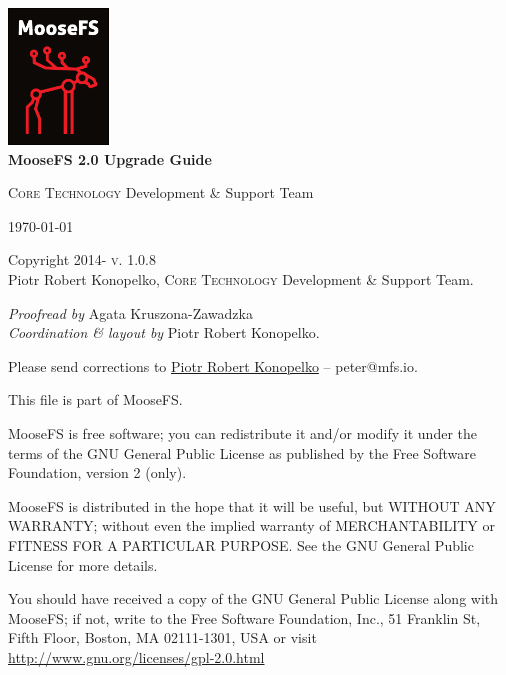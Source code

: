 \documentclass[a4paper,11pt,english]{report}
\newenvironment{copyrightnotice}
	{\begingroup
		\footnotesize
		\setlength{\parindent}{0pt}
		\setlength{\parskip}{\baselineskip}}
	{\endgroup}
\begin{document}
	
	\renewcommand{\labelitemi}{$\bullet$}
	\renewcommand{\labelitemii}{$\circ$}
	\renewcommand{\labelitemiii}{$\bullet$}
	\renewcommand{\labelitemiv}{$\circ$}
	
	\begin{titlepage}
		\begin{center}
			\includegraphics[width=0.2\textwidth]{images/moosefs.png}\\[1cm]

			{ \huge \bfseries MooseFS 2.0 Upgrade Guide \\[0.4cm] }


			\textsc{Core Technology} Development \& Support Team
			
			\vfill
			
			{\large \today}
		\end{center}
	\end{titlepage}
	
	
	\begin{copyrightnotice}
		\begin{flushleft}
			Copyright \textcopyright{} 2014-\the\year
			\hfill
			\textsc{v. 1.0.8}\\ %
			
			Piotr Robert Konopelko, \textsc{Core Technology} Development \& Support Team.
			
			\emph{Proofread by}
			Agata Kruszona-Zawadzka \\
			\emph{Coordination \& layout by} Piotr Robert Konopelko.
			
			Please send corrections to \href{mailto:peter@mfs.io}{Piotr Robert Konopelko} --  peter@mfs.io.
			
			\bigskip
			
			This file is part of MooseFS.
			
			MooseFS is free software; you can redistribute it and/or modify
			it under the terms of the GNU General Public License as published by
			the Free Software Foundation, version 2 (only).
			
			MooseFS is distributed in the hope that it will be useful,
			but WITHOUT ANY WARRANTY; without even the implied warranty of
			MERCHANTABILITY or FITNESS FOR A PARTICULAR PURPOSE. See the
			GNU General Public License for more details.
			
			You should have received a copy of the GNU General Public License
			along with MooseFS; if not, write to the Free Software
			Foundation, Inc., 51 Franklin St, Fifth Floor, Boston, MA 02111-1301, USA
			or visit \url{http://www.gnu.org/licenses/gpl-2.0.html}
		\end{flushleft}
	\end{copyrightnotice}
	
\end{document}
